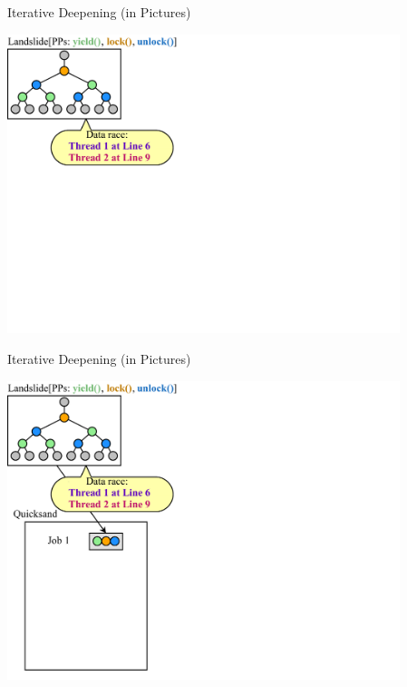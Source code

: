 \documentclass[xcolor=dvipsnames]{beamer}
\begin{document}
\begin{frame}{Iterative Deepening (in Pictures)}
	\begin{center}
	\vspace{-0.88em}
	\includegraphics[width=0.86\textwidth]{../../oopsla/dr-jobs-1.pdf}
	\end{center}
\end{frame}
\begin{frame}{Iterative Deepening (in Pictures)}
	\begin{center}
	\vspace{-0.88em}
	\includegraphics[width=0.86\textwidth]{../../oopsla/dr-jobs-2.pdf}
	\end{center}
\end{frame}
\end{document}
